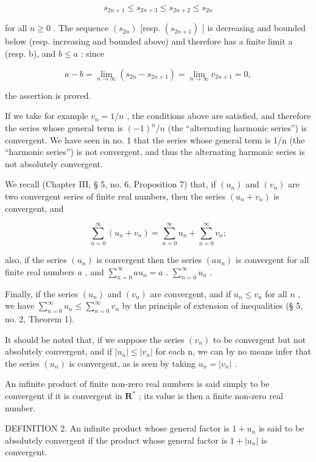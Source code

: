 \[
s _ {2 n + 1} \leqslant s _ {2 n + 3} \leqslant s _ {2 n + 2} \leqslant s _ {2 n}
\]

for all \(n \geqslant 0\) . The sequence \((s_{2n})\) {[}resp. \((s_{2n+1})\) {]} is decreasing and bounded below (resp. increasing and bounded above) and therefore has a finite limit a (resp. b), and \(b \leqslant a\) ; since

\[
a - b = \lim _ {n \rightarrow \infty} (s _ {2 n} - s _ {2 n + 1}) = \lim _ {n \rightarrow \infty} v _ {2 n + 1} = 0,
\]

the assertion is proved.

If we take for example \(v_{n}=1/n\) , the conditions above are satisfied, and therefore the series whose general term is \((-1)^{n}/n\) (the ``alternating harmonic series'') is convergent. We have seen in no. 1 that the series whose general term is 1/n (the ``harmonic series'') is not convergent, and thus the alternating harmonic series is not absolutely convergent.

We recall (Chapter III, § 5, no. 6, Proposition 7) that, if \((u_n)\) and \((v_n)\) are two convergent series of finite real numbers, then the series \((u_n + v_n)\) is convergent, and

\[
\sum_ {n = 0} ^ {\infty} \left(u _ {n} + v _ {n}\right) = \sum_ {n = 0} ^ {\infty} u _ {n} + \sum_ {n = 0} ^ {\infty} v _ {n};
\]

also, if the series \((u_{n})\) is convergent then the series \((au_{n})\) is convergent for all finite real numbers \(a\) , and \(\sum_{n=0}^{\infty} au_{n} = a\) . \(\sum_{n=0}^{\infty} u_{n}\) .

Finally, if the series \((u_n)\) and \((v_n)\) are convergent, and if \(u_n \leqslant v_n\) for all \(n\) , we have \(\sum_{n=0}^{\infty} u_n \leqslant \sum_{n=0}^{\infty} v_n\) by the principle of extension of inequalities (§ 5, no. 2, Theorem 1).

It should be noted that, if we suppose the series \((v_{n})\) to be convergent but not absolutely convergent, and if \(|u_{n}| \leqslant |v_{n}|\) for each n, we can by no means infer that the series \((u_{n})\) is convergent, as is seen by taking \(u_{n} = |v_{n}|\) .

An infinite product of finite non-zero real numbers is said simply to be convergent if it is convergent in \(\mathbf{R}^*\) ; its value is then a finite non-zero real number.

DEFINITION 2. An infinite product whose general factor is \(1 + u_{n}\) is said to be absolutely convergent if the product whose general factor is \(1 + |u_{n}|\) is convergent.

